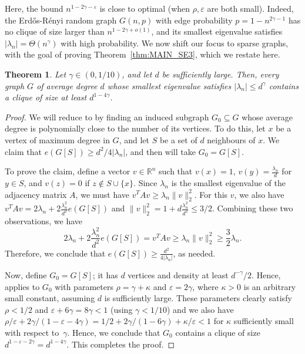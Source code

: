 \documentclass[11pt]{article}
\theoremstyle{plain}
\newtheorem{theorem}{Theorem}[section]
\theoremstyle{definition}
\newcommand{\eps}{\varepsilon}
\begin{document}
Here, the bound $n^{1-2\gamma-\eps}$ is close to optimal (when $\rho,\eps$ are both small). Indeed, the Erd\H{o}s-R\'enyi random graph $G(n,p)$ with edge probability $p=1-n^{2\gamma-1}$ has no clique of size larger than $n^{1-2\gamma+o(1)}$, and its smallest eigenvalue satisfies $|\lambda_n|=\Theta(n^\gamma)$ with high probability. We now shift our focus to sparse graphs, with the goal of proving Theorem~\ref{thm:MAIN_SE3}, which we restate here. 

\begin{theorem}
Let $\gamma\in (0,1/10)$, and let $d$ be sufficiently large. Then, every graph $G$ of average degree $d$ whose smallest eigenvalue satisfies $|\lambda_n|\leq d^\gamma$ contains a clique of size at least $d^{1-4\gamma}$.
\end{theorem}
\begin{proof}
    We will reduce to  by finding an induced subgraph $G_0\subseteq G$ whose average degree is polynomially close to the number of its vertices. 
    To do this, let $x$ be a vertex of maximum degree in $G$, and let $S$ be a set of $d$ neighbours of $x$. 
    We claim that $e(G[S])\geq d^2/4|\lambda_n|$, and then will take $G_0=G[S]$.
    
    To prove the claim, define a vector $v\in \mathbb{R}^{n}$ such that $v(x)=1$, $v(y)=\frac{\lambda_n}{d}$ for $y\in S$, and $v(z)=0$ if $z\not\in S\cup\{x\}$. Since $\lambda_n$ is the smallest eigenvalue of the adjacency matrix $A$, we must have $v^TAv\geq \lambda_n\|v\|_2^2$. 
    For this $v$, we also have 
    $v^T A v=2\lambda_n+2\frac{\lambda_n^2}{d^2}e(G[S])$ and $\|v\|_2^2=1+d\frac{\lambda_n^2}{d^2}\leq 3/2$.
    Combining these two observations, we have
    \[2\lambda_n+2\frac{\lambda_n^2}{d^2}e(G[S])=v^T A v\geq \lambda_n \|v\|_2^2\geq \frac{3}{2}\lambda_n.\]
    Therefore, we conclude that $e(G[S])\geq \frac{d^2}{4|\lambda_n|}$, as needed.
    
    Now, define $G_0=G[S]$; it has $d$ vertices and density at least $d^{-\gamma}/2$. 
    Hence,  applies to $G_0$ with parameters $\rho=\gamma+\kappa$ and $\eps=2\gamma$, where $\kappa>0$ is an arbitrary small constant, assuming $d$ is sufficiently large. 
    These parameters clearly satisfy $\rho<1/2$ and $\eps+6\gamma=8\gamma<1$ (using $\gamma<1/10$) and we also have $\rho/\eps+2\gamma/(1-\eps-4\gamma)=1/2+2\gamma/(1-6\gamma)+\kappa/\eps<1$ for $\kappa$ sufficiently small with respect to~$\gamma$. 
    Hence, we conclude that $G_0$ contains a clique of size $d^{1-\eps-2\gamma}=d^{1-4\gamma}$. This completes the proof.
\end{proof}
\end{document}
